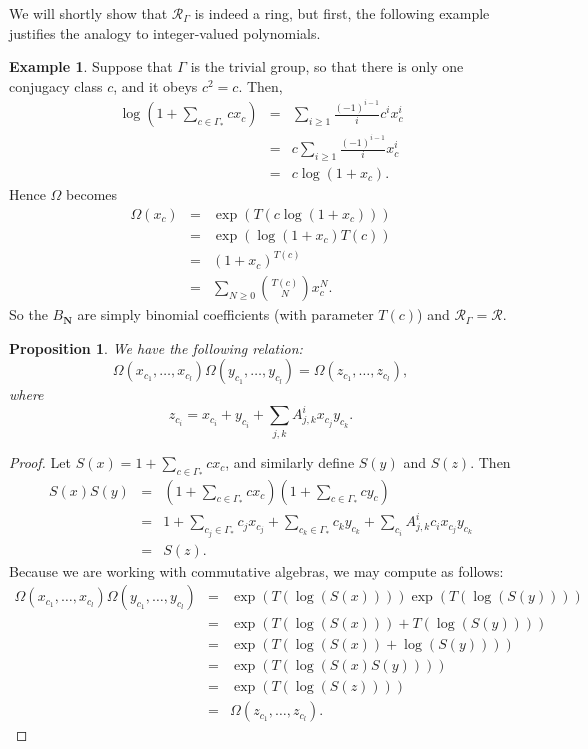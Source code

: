 \documentclass[10pt]{article}
\newtheorem{proposition}[theorem]{Proposition}
\theoremstyle{definition}
\newtheorem{example}[theorem]{Example}
\newcommand{\RGamma}{\mathcal{R}_{\Gamma}}
\begin{document}
We will shortly show that $\RGamma$ is indeed a ring, but first, the following example justifies the analogy to integer-valued polynomials.
\begin{example} \label{trivial_rg_example}
Suppose that $\Gamma$ is the trivial group, so that there is only one conjugacy class $c$, and it obeys $c^2 = c$. Then,
\begin{eqnarray*}
\log\left(1 + \sum_{c \in \Gamma_*} c x_c\right) &=& 
\sum_{i\geq 1} \frac{(-1)^{i-1}}{i} c^i x_c^i \\
&=& c \sum_{i\geq 1} \frac{(-1)^{i-1}}{i} x_c^i \\
&=& c \log(1+x_c).
\end{eqnarray*}
Hence $\Omega$ becomes
\begin{eqnarray*}
\Omega(x_{c}) &=& \exp(T(c \log(1+x_c))) \\
&=& \exp(\log(1+x_c) T(c)) \\
&=& (1+x_c)^{T(c)} \\
&=& \sum_{N \geq 0} \binom{T(c)}{N} x_c^N.
\end{eqnarray*}
So the $B_{\mathbf{N}}$ are simply binomial coefficients (with parameter $T(c)$) and $\RGamma = \mathcal{R}$.
\end{example}

\begin{proposition} \label{theta_product_prop}
We have the following relation:
\[
\Omega(x_{c_1}, \ldots, x_{c_l}) \Omega(y_{c_1}, \ldots, y_{c_l}) = \Omega(z_{c_1}, \ldots, z_{c_l}),
\]
where
\[
z_{c_i} = x_{c_i} + y_{c_i} + \sum_{j,k}A_{j,k}^{i}x_{c_j} y_{c_k}.
\]
\end{proposition}
\begin{proof}
Let $S(x) = 1 + \sum_{c \in \Gamma_*} c x_c$, and similarly define $S(y)$ and $S(z)$. Then
\begin{eqnarray*}
S(x)S(y) &=& \left(1 + \sum_{c \in \Gamma_*} c x_c\right)\left(1 + \sum_{c \in \Gamma_*} c y_c\right) \\
&=& 1 + \sum_{c_j \in \Gamma_*} c_j x_{c_j} + \sum_{c_k \in \Gamma_*} c_k y_{c_k} + \sum_{c_i} A_{j,k}^i c_i x_{c_j}y_{c_k} \\
&=& S(z).
\end{eqnarray*}
Because we are working with commutative algebras, we may compute as follows:
\begin{eqnarray*}
\Omega(x_{c_1}, \ldots, x_{c_l}) \Omega(y_{c_1}, \ldots, y_{c_l})
&=& \exp\left(T\left(\log\left(S(x)\right)\right)\right) \exp\left(T\left(\log\left(S(y)\right)\right)\right) \\
&=& \exp\left(T\left(\log\left(S(x)\right)\right) + T\left(\log\left(S(y)\right)\right)\right) \\
&=&\exp\left(T\left(\log\left(S(x)\right)+\log\left(S(y)\right)\right)\right) \\
&=&\exp\left(T\left(\log\left(S(x)S(y)\right)\right)\right) \\
&=&\exp\left(T\left(\log\left(S(z)\right)\right)\right) \\
&=& \Omega(z_{c_1}, \ldots, z_{c_l}).
\end{eqnarray*}
\qedhere
\end{proof}
\end{document}
